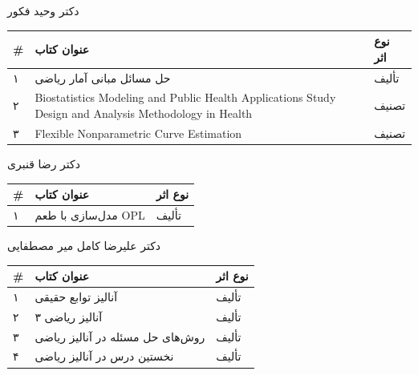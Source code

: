 \documentclass[
  letterpaper,
  DIV=11,
  numbers=noendperiod]{scrreprt}
\newcounter{none} %
\begin{document}
دکتر وحید فکور

{\def\LTcaptype{none} %
\begin{longtable}[]{@{}
  >{\raggedright\arraybackslash}p{}
  >{\raggedright\arraybackslash}p{}
  >{\raggedright\arraybackslash}p{}@{}}
\toprule\noalign{}
\begin{minipage}[b]{\linewidth}\raggedright
\#
\end{minipage} & \begin{minipage}[b]{\linewidth}\raggedright
عنوان کتاب
\end{minipage} & \begin{minipage}[b]{\linewidth}\raggedright
نوع اثر
\end{minipage} \\
\midrule\noalign{}
\endhead
\bottomrule\noalign{}
\endlastfoot
۱ & حل مسائل مبانی آمار ریاضی & تألیف \\
۲ & Biostatistics Modeling and Public Health Applications Study Design
and Analysis Methodology in Health & تصنیف \\
۳ & Flexible Nonparametric Curve Estimation & تصنیف \\
\end{longtable}
}

دکتر رضا قنبری

{\def\LTcaptype{none} %
\begin{longtable}[]{@{}lll@{}}
\toprule\noalign{}
\# & عنوان کتاب & نوع اثر \\
\midrule\noalign{}
\endhead
\bottomrule\noalign{}
\endlastfoot
۱ & مدل‌سازی با طعم OPL & تألیف \\
\end{longtable}
}

دکتر علیرضا کامل میر مصطفایی

{\def\LTcaptype{none} %
\begin{longtable}[]{@{}lll@{}}
\toprule\noalign{}
\# & عنوان کتاب & نوع اثر \\
\midrule\noalign{}
\endhead
\bottomrule\noalign{}
\endlastfoot
۱ & آنالیز توابع حقیقی & تألیف \\
۲ & آنالیز ریاضی ۳ & تألیف \\
۳ & روش‌های حل مسئله در آنالیز ریاضی & تألیف \\
۴ & نخستین درس در آنالیز ریاضی & تألیف \\
\end{longtable}
}
\end{document}
